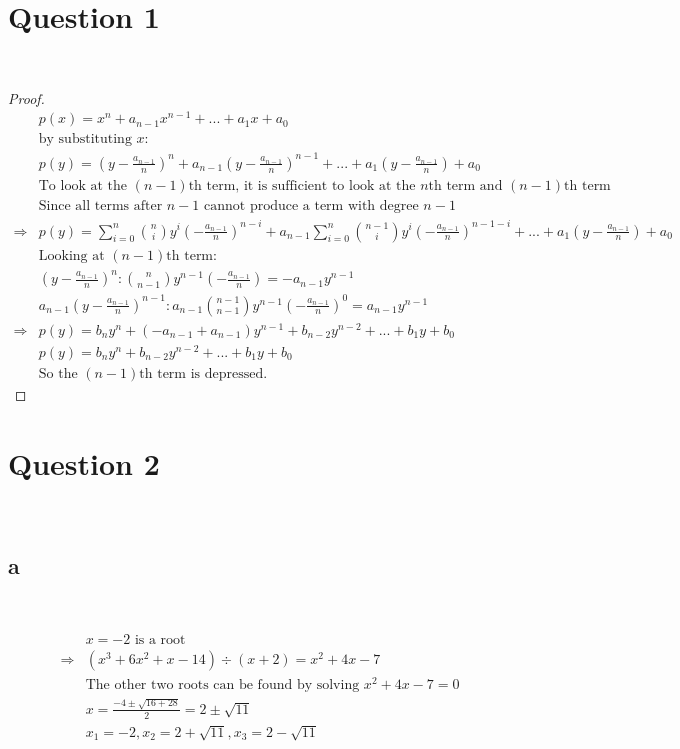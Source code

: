\documentclass{article}
\begin{document}
\section*{Question 1}

~

\begin{proof}
    \begin{align*}
        &p(x)=x^n+a_{n-1}x^{n-1}+...+a_1x+a_0\\
        &\text{by substituting }x:\\
        &p(y)=(y-\frac{a_{n-1}}{n})^n+a_{n-1}(y-\frac{a_{n-1}}{n})^{n-1}+...+a_1(y-\frac{a_{n-1}}{n})+a_0\\
        &\text{To look at the }(n-1)\text{th term, it is sufficient to look at the }n\text{th term and }(n-1)\text{th term}\\
        &\text{Since all terms after }n-1\text{ cannot produce a term with degree }n-1\\
        \Rightarrow&p(y)=\sum_{i=0}^{n}\binom{n}{i}y^i(-\frac{a_{n-1}}{n})^{n-i}+a_{n-1}\sum_{i=0}^{n}\binom{n-1}{i}y^i(-\frac{a_{n-1}}{n})^{n-1-i}+...+a_1(y-\frac{a_{n-1}}{n})+a_0\\
        &\text{Looking at }(n-1)\text{th term}:\\
        &(y-\frac{a_{n-1}}{n})^n:\binom{n}{n-1}y^{n-1}(-\frac{a_{n-1}}{n})=-a_{n-1}y^{n-1}\\
        &a_{n-1}(y-\frac{a_{n-1}}{n})^{n-1}:a_{n-1}\binom{n-1}{n-1}y^{n-1}(-\frac{a_{n-1}}{n})^0=a_{n-1}y^{n-1}\\
        \Rightarrow&p(y)=b_ny^n+(-a_{n-1}+a_{n-1})y^{n-1}+b_{n-2}y^{n-2}+...+b_1y+b_0\\
        &p(y)=b_ny^n+b_{n-2}y^{n-2}+...+b_1y+b_0\\
        &\text{So the }(n-1)\text{th term is depressed}.
    \end{align*}
\end{proof}

\newpage

\section*{Question 2}

~

\subsection*{a}

~

\begin{align*}
    &x=-2\text{ is a root}\\
    \Rightarrow&(x^3+6x^2+x-14)\div(x+2)=x^2+4x-7\\
    &\text{The other two roots can be found by solving } x^2+4x-7=0\\
    &x=\frac{-4\pm\sqrt{16+28}}{2}=2\pm\sqrt{11}\\
    &x_1=-2,x_2=2+\sqrt{11},x_3=2-\sqrt{11}\\
\end{align*}
\end{document}
